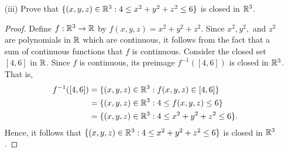 \documentclass[a4paper]{article}
\begin{document}
\begin{problem}
\begin{enumerate}
\begin{proof}
            Now, the intersection of the sets in (a) and (b) are open and so the original set \( \{ (x,y) \in \R^{2} : x > y , x^{2} + y^{2} < 1  \}  \) are open in \( \R^{2} \). 
            \end{proof}
        \item[(iii)] Prove that \( \{ (x,y,z) \in \mathbb{R}^{3} : 4 \leq  x^{2} + y^{2} + z^{2} \leq 6 \}  \) is closed in \( \mathbb{R}^{3} \).
            \begin{proof}
                Define \( f: \mathbb{R}^{3} \to \mathbb{R}  \) by \( f(x,y,z) = x^{2} + y^{2} + z^{2} \). Since \( x^{2}, y^{2},  \) and \( z^{2} \) are polynomials in \( \mathbb{R}  \) which are continuous, it follows from the fact that a sum of continuous functions that \( f  \) is continuous. Consider the closed set \( [4,6] \) in \( \mathbb{R}  \). Since \( f \) is continuous, its preimage \( f^{-1}([4,6]) \) is closed in \( \mathbb{R}^{3} \). That is, 
                \begin{align*}
                    f^{-1} ([4,6]) &= \{ (x,y,z) \in \mathbb{R}^{3} : f(x,y,z) \in [4,6] \}  \\
                                   &= \{ (x,y,z) \in \mathbb{R}^{3} : 4 \leq f(x,y,z) \leq 6 \} \\
                                   &= \{ (x,y,z) \in \mathbb{R}^{3} : 4 \leq x^{2} + y^{2} + z^{2} \leq 6 \}.
                \end{align*}
                Hence, it follows that \( \{ (x,y,z) \in \mathbb{R}^{3}: 4 \leq x^{2} + y^{2} + z^{2} \leq 6  \}   \) is closed in \( \mathbb{R}^{3} \).
            \end{proof}
   \end{enumerate} 
\end{problem}
\end{document}
